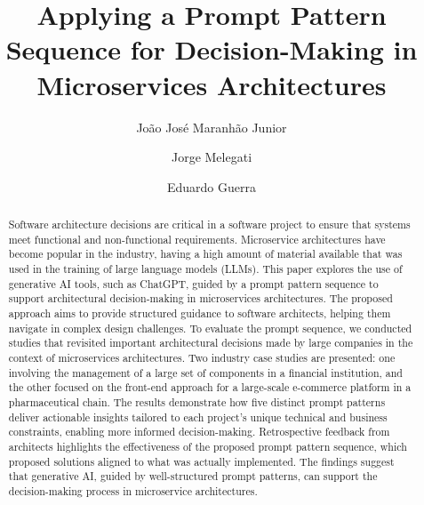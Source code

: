 \documentclass[runningheads]{llncs}
\begin{document}
\title{Applying a Prompt Pattern Sequence for Decision-Making in Microservices Architectures}

\author{João José Maranhão Junior  
\and Jorge Melegati
\and Eduardo Guerra}


\maketitle 

\begin{abstract}
Software architecture decisions are critical in a software project to ensure that systems meet functional and non-functional requirements. Microservice architectures have become popular in the industry, having a high amount of material available that was used in the training of large language models (LLMs). This paper explores the use of generative AI tools, such as ChatGPT, guided by a prompt pattern sequence to support architectural decision-making in microservices architectures. The proposed approach aims to provide structured guidance to software architects, helping them navigate in complex design challenges. To evaluate the prompt sequence, we conducted studies that revisited important architectural decisions made by large companies in the context of microservices architectures. Two industry case studies are presented: one involving the management of a large set of components in a financial institution, and the other focused on the front-end approach for a large-scale e-commerce platform in a pharmaceutical chain. The results demonstrate how five distinct prompt patterns deliver actionable insights tailored to each project’s unique technical and business constraints, enabling more informed decision-making. Retrospective feedback from architects highlights the effectiveness of the proposed prompt pattern sequence, which proposed solutions aligned to what was actually implemented. The findings suggest that generative AI, guided by well-structured prompt patterns, can support the decision-making process in microservice architectures.


\end{abstract}
\end{document}
